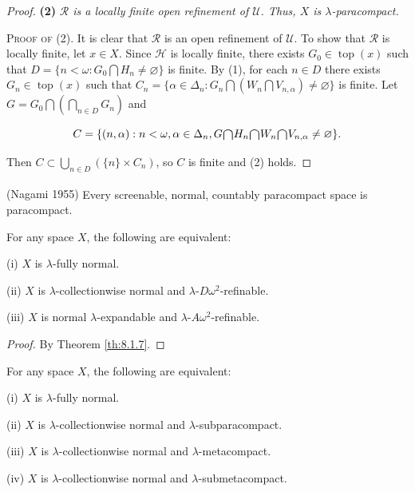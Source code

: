 \documentclass[jiang8iv.tex]{subfiles}
\begin{document}
\begin{proof}
\textbf{(2)} \textit{\(\mathscr{R}\) is a locally finite open refinement of \(\mathscr{U}\). Thus, 
\(X\) is $\lambda$-paracompact.}

\noindent\textsc{Proof of (2)}. It is clear that \(\mathscr{R}\) is an open refinement of \(\mathscr{U}\). To show
that \(\mathscr{R}\) is locally finite, let \(x\in X\). Since \(\mathscr{H}\) is locally finite, 
there exists \(G_0\in\operatorname{top}(x)\) such
that \(D=\{n<\omega: G_0\bigcap H_n \ne \varnothing\}\) is finite. By (1), 
for each \(n\in D\)
there exists \(G_n\in\operatorname{top}(x)\) such that 
\(C_n=\{\alpha\in\Delta_n: G_n\bigcap(W_n\bigcap V_{n,\alpha})\neq\varnothing\}\)
is finite. Let \(G=G_0\bigcap(\bigcap_{n\in D}G_n)\) and

$$C=\{(n,\alpha): n<\omega,\alpha\in\Delta_n, G\raisebox{-2pt}{\scalebox{1.5}{$\cap$}} H_n 
\raisebox{-2pt}{\scalebox{1.5}{$\cap$}} W_n \raisebox{-2pt}{\scalebox{1.5}{$\cap$}} 
V_{n,\alpha} \neq\varnothing\}.$$

\noindent Then $C\subset \bigcup_{n\in D}(\{n\}\times C_n)$, 
so \(C\) is finite and (2) holds.
\end{proof} 


\begin{corollary} \label{cor:8.2.2}
\textup{(\hstretch{1.8}{[}Nagami 1955\hstretch{1.8}{]}\textsuperscript{\cite{Nagami}})}
Every screenable, normal, countably paracompact space is paracompact. \hfill\qedsymbol
\end{corollary}


{\theorem{\label{th:8.2.3}}
For any space $X$, the following are equivalent:

\textup{(i)}  \(X\) is \(\lambda\)-fully normal.

\textup{(ii)}  \(X\) is \(\lambda\)-collectionwise normal and 
\(\lambda\)-$D\omega^2$-refinable.

\textup{(iii)}  \(X\) is normal \(\lambda\)-expandable and 
\(\lambda\)-$A\omega^2$-refinable.
}

\begin{proof}
By Theorem \ref{th:8.1.7}.
\end{proof}

{\corollary{} \label{cor:8.2.4}
For any space $X$, the following are
equivalent:

\textup{(i)}  \(X\) is \(\lambda\)-fully normal.

\textup{(ii)}  \(X\) is \(\lambda\)-collectionwise normal and \(\lambda\)-subparacompact.

\textup{(iii)}  \(X\) is \(\lambda\)-collectionwise normal and \(\lambda\)-metacompact.

\textup{(iv)}  \(X\) is \(\lambda\)-collectionwise normal and 
\(\lambda\)-submetacompact.
}
\end{document}
